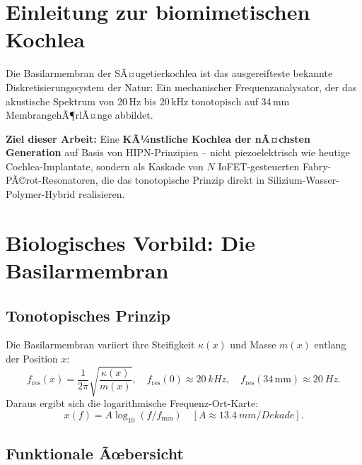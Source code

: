 ﻿\documentclass[a4paper,12pt]{scrreprt}
\theoremstyle{definition}
\begin{document}
\section{Einleitung zur biomimetischen Kochlea}

Die Basilarmembran der SÃ¤ugetierkochlea ist das ausgereifteste bekannte
Diskretisierungssystem der Natur: Ein mechanischer Frequenzanalysator,
der das akustische Spektrum von 20\,Hz bis 20\,kHz tonotopisch auf
34\,mm MembrangehÃ¶rlÃ¤nge abbildet.

\textbf{Ziel dieser Arbeit:} Eine \textbf{KÃ¼nstliche Kochlea der nÃ¤chsten
Generation} auf Basis von HIPN-Prinzipien -- nicht piezoelektrisch wie
heutige Cochlea-Implantate, sondern als Kaskade von
$N$ IoFET-gesteuerten Fabry-PÃ©rot-Resonatoren, die das tonotopische
Prinzip direkt in Silizium-Wasser-Polymer-Hybrid realisieren.

\section{Biologisches Vorbild: Die Basilarmembran}

\subsection{Tonotopisches Prinzip}

Die Basilarmembran variiert ihre Steifigkeit $\kappa(x)$ und Masse
$m(x)$ entlang der Position $x$:
\[
  f_{\mathrm{res}}(x) = \frac{1}{2\pi}\sqrt{\frac{\kappa(x)}{m(x)}},
  \quad f_{\mathrm{res}}(0) \approx \SI{20}{kHz},\quad
  f_{\mathrm{res}}(34\,\mathrm{mm}) \approx \SI{20}{Hz}.
\]
Daraus ergibt sich die logarithmische Frequenz-Ort-Karte:
\[
  x(f) = A\log_{10}(f/f_{\min}) \quad [A \approx \SI{13.4}{mm/Dekade}].
\]

\subsection{Funktionale Ãœbersicht}
\end{document}
